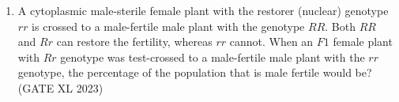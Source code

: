 \begin{enumerate}[label=\thechapter.\arabic*,ref=\thechapter.\theenumi]
\item A cytoplasmic male-sterile female plant with the restorer (nuclear) genotype $rr$ is crossed to a male-fertile male plant with the genotype $RR$. Both $RR$ and $Rr$ can restore the fertility, whereas $rr$ cannot. When an $F1$ female plant with $Rr$ genotype was test-crossed to a male-fertile male plant with the $rr$ genotype, the percentage of the population that is male fertile would be?
\hfill (GATE XL 2023)\\

\end{enumerate}
